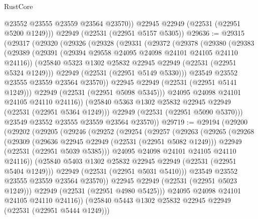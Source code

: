 \begin{lexlean}{RustCore}
\begin{coremodule}
          @23552
          @23555
          @23559
          @23564
          @23570))
      @22945
      @22949
      (@22531 (@22951 @5200 @1249)))
    @22949
    (@22531 (@22951 @5157 @5305))
@29636 := @29315
    (@29317
      (@29320
        (@29326
          (@29328
            (@29331
              (@29372
                (@29378
                  (@29380
                    (@29383
                      (@29389
                        (@29391 (@29394 @29558 @24095 @24098 @24101 @24105 @24110 @24116))
                        (@25840 @5323 @1302 @25832 @22945 @22949 (@22531 (@22951 @5324 @1249)))
                        @22949
                        (@22531 (@22951 @5149 @5330)))
                      @23549
                      @23552
                      @23555
                      @23559
                      @23564
                      @23570))
                  @22945
                  @22949
                  (@22531 (@22951 @5141 @1249)))
                @22949
                (@22531 (@22951 @5098 @5345)))
              @24095
              @24098
              @24101
              @24105
              @24110
              @24116))
          (@25840 @5363 @1302 @25832 @22945 @22949 (@22531 (@22951 @5364 @1249)))
          @22949
          (@22531 (@22951 @5090 @5370)))
        @23549
        @23552
        @23555
        @23559
        @23564
        @23570))
@29719 := @29194
    (@29200
      (@29202
        (@29205
          (@29246
            (@29252
              (@29254
                (@29257
                  (@29263
                    (@29265
                      (@29268
                        (@29309
                          (@29636 @22945 @22949 (@22531 (@22951 @5082 @1249)))
                          @22949
                          (@22531 (@22951 @5039 @5385)))
                        @24095
                        @24098
                        @24101
                        @24105
                        @24110
                        @24116))
                    (@25840 @5403 @1302 @25832 @22945 @22949 (@22531 (@22951 @5404 @1249)))
                    @22949
                    (@22531 (@22951 @5031 @5410)))
                  @23549
                  @23552
                  @23555
                  @23559
                  @23564
                  @23570))
              @22945
              @22949
              (@22531 (@22951 @5023 @1249)))
            @22949
            (@22531 (@22951 @4980 @5425)))
          @24095
          @24098
          @24101
          @24105
          @24110
          @24116))
      (@25840 @5443 @1302 @25832 @22945 @22949 (@22531 (@22951 @5444 @1249)))

\end{coremodule}
\end{lexlean}
